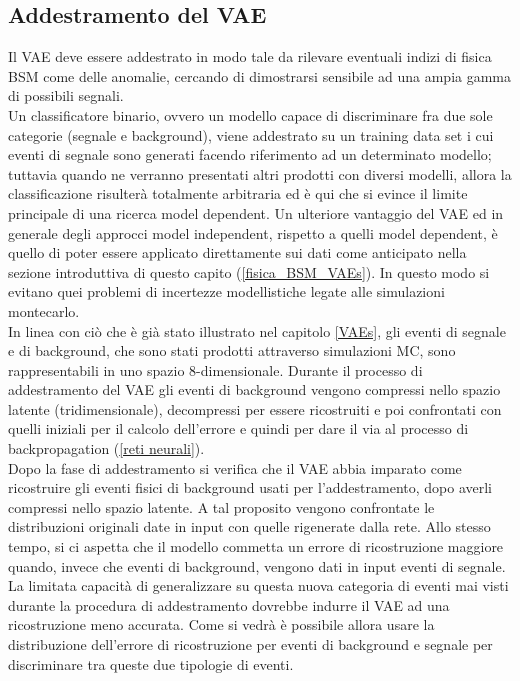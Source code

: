 \subsection{Addestramento del VAE}
\label{simulazione}
Il VAE deve essere addestrato in modo tale da rilevare eventuali indizi di fisica BSM come delle anomalie, cercando di dimostrarsi sensibile ad una ampia gamma di possibili segnali.\\
Un classificatore binario, ovvero un modello capace di discriminare fra due sole categorie (segnale e background), viene addestrato su un training data set i cui eventi di segnale sono generati facendo riferimento ad un determinato modello; tuttavia quando ne verranno presentati altri prodotti con diversi modelli, allora la classificazione risulterà totalmente arbitraria ed è qui che si evince il limite principale di una ricerca model dependent. Un ulteriore vantaggio del VAE ed in generale degli approcci model independent, rispetto a quelli model dependent, è quello di poter essere applicato direttamente sui dati come anticipato nella sezione introduttiva di questo capito (\ref{fisica_BSM_VAEs}). In questo modo si evitano quei problemi di incertezze modellistiche legate alle simulazioni montecarlo.\\
In linea con ciò che è già stato illustrato nel capitolo \ref{VAEs}, gli eventi di segnale e di background, che sono stati prodotti attraverso simulazioni MC, sono rappresentabili in uno spazio 8-dimensionale. Durante il processo di addestramento del VAE gli eventi di background vengono compressi nello spazio latente (tridimensionale), decompressi per essere ricostruiti e poi confrontati con quelli iniziali per il calcolo dell'errore e quindi per dare il via al processo di backpropagation (\ref{reti neurali}). \\
Dopo la fase di addestramento si verifica che il VAE abbia imparato come ricostruire gli eventi fisici di background usati per l'addestramento, dopo averli compressi nello spazio latente. A tal proposito vengono confrontate le distribuzioni originali date in input con quelle rigenerate dalla rete. Allo stesso tempo, si ci aspetta che il modello  commetta un errore di ricostruzione maggiore quando, invece che eventi di background, vengono dati in input eventi di segnale. La limitata capacità di generalizzare su questa nuova categoria di eventi mai visti durante la procedura di addestramento dovrebbe indurre il VAE ad una ricostruzione meno accurata. Come si vedrà è possibile allora usare la distribuzione dell'errore di ricostruzione per eventi di background e segnale per discriminare tra queste due tipologie di eventi.\\
